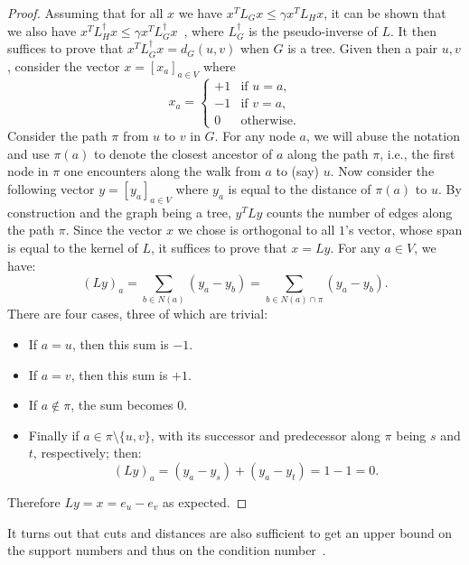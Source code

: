 \begin{proof}
 Assuming that for all $x$ we have $x^T L_G x \leq \gamma x^T L_H x$, 
 it can be shown that we also have  $x^T L_H^{\dagger} x \leq \gamma x^T L_G^{\dagger} x$~\cite{support03boman}, where $L_G^{\dagger}$ is the pseudo-inverse of $L$.  
 It then suffices to prove that $x^T L_G^{\dagger} x = d_G(u, v)$ when $G$ is a
 tree.  Given then a pair $u, v$,   consider the vector $x=[x_a]_{a\in V}$ where $$x_a =
  \begin{cases}
    +1 & \mbox{if $u = a$,} \\
    -1 & \mbox{if $v = a$,} \\
    0 & \mbox{otherwise.}
  \end{cases}$$
  Consider the path $\pi$ from $u$ to $v$ in $G$. For any node $a$, we
  will abuse the notation and use $\pi(a)$ to denote the closest
  ancestor of $a$ along the path $\pi$, i.e., the first node in $\pi$
  one encounters along the walk from $a$ to (say) $u$. Now consider
  the following vector $y=[y_a]_{a\in V}$ where $y_a$ is equal to the
  distance of $\pi(a)$ to $u$.  By construction and the graph being a
  tree, $y^T L y$ counts the number of edges along the path $\pi$.
  Since the vector $x$ we chose is orthogonal to all $1$'s vector,
  whose span is equal to the kernel of $L$, it suffices to prove that
  $x = L y$.
  For any $a\in V$, we have:
  \[
    (L y)_a 
    = \sum_{b \in N(a)} (y_a - y_b)
    =  \sum_{b\in N(a) \cap \pi} (y_a - y_b).
  \]
  There are four cases, three of which are trivial:
  \begin{itemize}
  \item If $a=u$, then this sum is $-1$. 
  \item If $a=v$, then this sum is $+1$. 
  \item If $a \notin \pi$, the sum becomes $0$.
  \item Finally if $a \in \pi\setminus\{u,v\}$, with its successor and
    predecessor along $\pi$ being $s$ and $t$, respectively; then:
    \[
      (L y)_a 
      = (y_a - y_s) + (y_a - y_t)
      = 1 - 1 = 0. 
    \]    
  \end{itemize}
  Therefore $L y = x = e_u - e_v$ as expected.
\end{proof}
%
%
It turns out that cuts and distances are also sufficient to
get an upper bound on the support numbers and thus on the condition number~\cite{GuatteryM00}.
